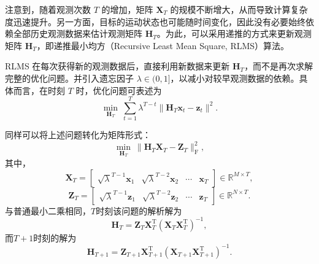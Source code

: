 注意到，随着观测次数 \( T \) 的增加，矩阵 \( \mathbf{X}_T \) 的规模不断增大，从而导致计算复杂度迅速提升。另一方面，目标的运动状态也可能随时间变化，因此没有必要始终依赖全部历史观测数据来估计观测矩阵 \( \mathbf{H}_T \)。为此，可以采用递推的方式来更新观测矩阵 \( \mathbf{H}_T \)，即递推最小均方（Recursive Least Mean Square, RLMS）算法。

RLMS 在每次获得新的观测数据后，直接利用新数据来更新 \( \mathbf{H}_T \)，而不是再次求解完整的优化问题。并引入遗忘因子 \( \lambda \in (0,1] \)，以减小对较早观测数据的依赖。具体而言，在时刻 \( T \) 时，优化问题可表述为
\[
    \min_{\mathbf{H}_T} \ \sum_{t=1}^{T} \lambda^{T-t} \big\| \mathbf{H}_T\bm{x}_t - \bm{z}_t \big\|^2.
\]

同样可以将上述问题转化为矩阵形式：
\[
    \min_{\mathbf{H}_T} \ \big\| \mathbf{H}_T \mathbf{X}_T - \mathbf{Z}_T\big\|_{\mathrm{F}}^2,
\]
其中，
\[
    \mathbf{X}_T = \begin{bmatrix} \sqrt{\lambda}^{T-1}\bm{x}_1 & \sqrt{\lambda}^{T-2}\bm{x}_2 & \cdots & \bm{x}_T \end{bmatrix} \in \mathbb{R}^{M \times T},
\]
\[
    \mathbf{Z}_T = \begin{bmatrix} \sqrt{\lambda}^{T-1}\bm{z}_1 & \sqrt{\lambda}^{T-2}\bm{z}_2 & \cdots & \bm{z}_T \end{bmatrix} \in \mathbb{R}^{N \times T}.
\]
与普通最小二乘相同，\( T \)时刻该问题的解析解为
\[
    \mathbf{H}_T = \mathbf{Z}_T \mathbf{X}_T^{\mathrm{T}} \left( \mathbf{X}_T \mathbf{X}_T ^{\mathrm{T}} \right)^{-1},
\]
而\( T + 1 \)时刻的解为
\[
    \mathbf{H}_{T+1} = \mathbf{Z}_{T+1} \mathbf{X}_{T+1}^{\mathrm{T}} \left( \mathbf{X}_{T+1} \mathbf{X}_{T+1} ^{\mathrm{T}} \right)^{-1}.
\]

